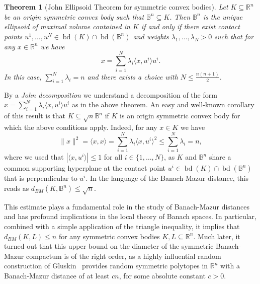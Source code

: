 \documentclass[12pt,a4paper]{article}
\newtheorem{twr}{Theorem}[section]
\theoremstyle{definition}
\DeclareMathOperator{\bd}{bd}
\newcommand\R{\mathbb{R}}
\newcommand\B{\mathbb{B}}
\newcommand\cemph[1]{\emph{\color{red}#1}}
\begin{document}
\begin{twr}[John Ellipsoid Theorem for symmetric convex bodies]
\label{thm:john}
Let $K \subseteq \R^n$ be an origin symmetric convex body such that $\B^n \subseteq K$. Then $\B^n$ is the unique ellipsoid of maximal volume contained in $K$ if and only if there exist contact points $u^1, \ldots, u^N \in \bd(K) \cap \bd(\B^n)$ and weights $\lambda_1, \ldots, \lambda_N>0$ such that for any $x \in \R^n$ we have
$$ x = \sum_{i=1}^{N} \lambda_i \langle x, u^i \rangle u^i.$$
In this case, $\sum_{i=1}^N \lambda_i = n$ and there exists a choice with $N \leq \frac{n(n+1)}{2}$.
\end{twr}



By a \cemph{John decomposition} we understand a decomposition of the form $x = \sum_{i=1}^{N} \lambda_i \langle x, u^i \rangle u^i$ as in the above theorem. An easy and well-known corollary of this result is that $K \subseteq \sqrt{n} \B^n$ if $K$ is an origin symmetric convex body for which the above conditions apply. Indeed, for any $x \in K$ we have
\begin{equation}
\label{eq:john_ineq}
\|x\|^2 = \langle x, x \rangle = \sum_{i=1}^N \lambda_i \langle x, u^i \rangle^2 \leq \sum_{i=1}^N \lambda_i = n,
\end{equation}
where we used that $| \langle x, u^i \rangle | \leq 1$ for all $i \in \{1, \ldots, N\}$, as $K$ and $\B^n$ share a common supporting hyperplane at the contact point $u^i \in \bd(K) \cap \bd(\B^n)$ that is perpendicular to $u^i$. In the language of the Banach-Mazur distance, this reads as $d_{BM}(K, \B^n) \leq \sqrt{n}$.
\newpage

This estimate plays a fundamental role in the study of Banach-Mazur distances and has profound implications in the local theory of Banach spaces. In particular, combined with a simple application of the triangle inequality, it implies that $d_{BM}(K, L) \leq n$ for any symmetric convex bodies $K, L \subseteq \R^n$. Much later, it turned out that this upper bound on the diameter of the symmetric Banach-Mazur compactum is of the right order, as a highly influential random construction of Gluskin~\cite{gluskin} provides random symmetric polytopes in $\R^n$ with a Banach-Mazur distance of at least $cn$, for some absolute constant $c>0$.
\end{document}

